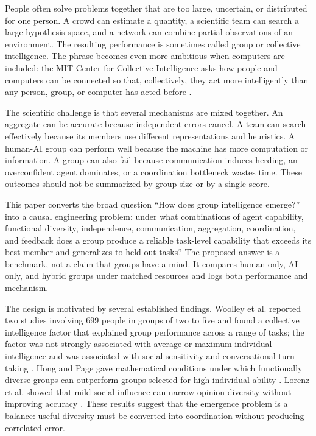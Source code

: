 \documentclass[conference]{IEEEtran}
\begin{document}
People often solve problems together that are too large, uncertain, or distributed for one person. A crowd can estimate a quantity, a scientific team can search a large hypothesis space, and a network can combine partial observations of an environment. The resulting performance is sometimes called group or collective intelligence. The phrase becomes even more ambitious when computers are included: the MIT Center for Collective Intelligence asks how people and computers can be connected so that, collectively, they act more intelligently than any person, group, or computer has acted before \cite{mitcci}.

The scientific challenge is that several mechanisms are mixed together. An aggregate can be accurate because independent errors cancel. A team can search effectively because its members use different representations and heuristics. A human-AI group can perform well because the machine has more computation or information. A group can also fail because communication induces herding, an overconfident agent dominates, or a coordination bottleneck wastes time. These outcomes should not be summarized by group size or by a single score.

This paper converts the broad question ``How does group intelligence emerge?'' into a causal engineering problem: under what combinations of agent capability, functional diversity, independence, communication, aggregation, coordination, and feedback does a group produce a reliable task-level capability that exceeds its best member and generalizes to held-out tasks? The proposed answer is a benchmark, not a claim that groups have a mind. It compares human-only, AI-only, and hybrid groups under matched resources and logs both performance and mechanism.

The design is motivated by several established findings. Woolley et al. reported two studies involving 699 people in groups of two to five and found a collective intelligence factor that explained group performance across a range of tasks; the factor was not strongly associated with average or maximum individual intelligence and was associated with social sensitivity and conversational turn-taking \cite{woolley2010}. Hong and Page gave mathematical conditions under which functionally diverse groups can outperform groups selected for high individual ability \cite{hongpage2004}. Lorenz et al. showed that mild social influence can narrow opinion diversity without improving accuracy \cite{lorenz2011}. These results suggest that the emergence problem is a balance: useful diversity must be converted into coordination without producing correlated error.
\end{document}
